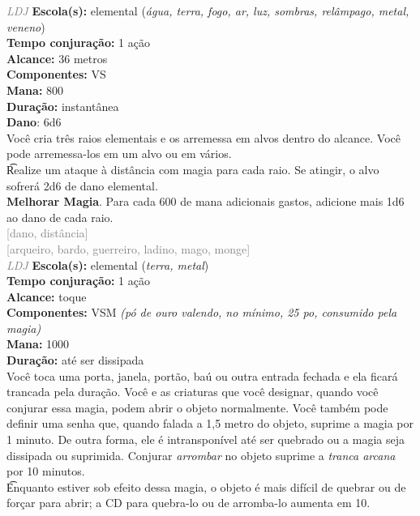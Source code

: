 \documentclass{RPG_Adventure}[2021/10/20]
\begin{document}
{\tiny \textcolor{gray}{\textit{LDJ}}}\jump{}
{\small \t \textbf{Escola(s):} elemental (\textit{água, terra, fogo, ar, luz, sombras, relâmpago, metal, veneno})\\\t \textbf{Tempo conjuração:} 1 ação\\\t \textbf{Alcance:} 36 metros\\\t \textbf{Componentes:} VS\\\t \textbf{Mana:} 800\\\t \textbf{Duração:} instantânea\\\t \textbf{Dano}: 6d6\\}
{\normalsize Você cria três raios elementais e os arremessa em alvos dentro do alcance. Você pode arremessa-los em um alvo ou em vários.\\\t Realize um ataque à distância com magia para cada raio. Se atingir, o alvo sofrerá 2d6 de dano elemental.\\\t \textbf{Melhorar Magia}. Para cada 600 de mana adicionais gastos, adicione mais 1d6 ao dano de cada raio.\\}
{\scriptsize \textcolor{gray}{[dano, distância]\\}}
{\scriptsize \textcolor{gray}{[arqueiro, bardo, guerreiro, ladino, mago, monge]\\}}
{\tiny \textcolor{gray}{\textit{LDJ}}}\jump{}
{\small \t \textbf{Escola(s):} elemental (\textit{terra, metal})\\\t \textbf{Tempo conjuração:} 1 ação\\\t \textbf{Alcance:} toque\\\t \textbf{Componentes:} VSM \textit{(pó de ouro valendo, no mínimo, 25 po, consumido pela magia)}\\\t \textbf{Mana:} 1000\\\t \textbf{Duração:} até ser dissipada\\}
{\normalsize Você toca uma porta, janela, portão, baú ou outra entrada fechada e ela ficará trancada pela duração. Você e as criaturas que você designar, quando você conjurar essa magia, podem abrir o objeto normalmente. Você também pode definir uma senha que, quando falada a 1,5 metro do objeto, suprime a magia por 1 minuto. De outra forma, ele é intransponível até ser quebrado ou a magia seja dissipada ou suprimida. Conjurar \textit{arrombar} no objeto suprime a \textit{tranca arcana} por 10 minutos.\\\t Enquanto estiver sob efeito dessa magia, o objeto é mais difícil de quebrar ou de forçar para abrir; a CD para quebra-lo ou de arromba-lo aumenta em 10.\\}
\end{document}
